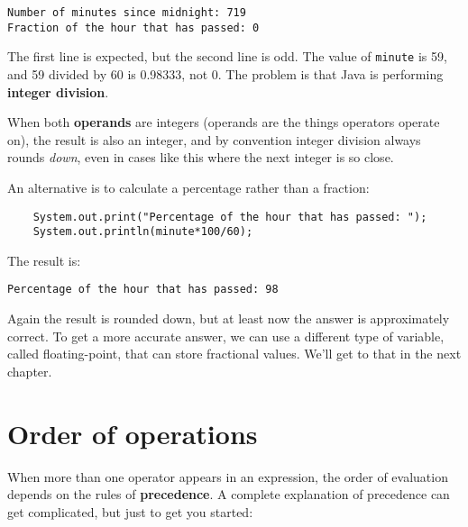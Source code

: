 \documentclass[12pt]{book}
\theoremstyle{definition}
\begin{document}
\begin{lstlisting}
Number of minutes since midnight: 719
Fraction of the hour that has passed: 0
\end{lstlisting}
%
The first line is expected, but the second line is
odd.  The value of {\tt minute} is 59, and
59 divided by 60 is 0.98333, not 0.  The problem is that
Java is performing {\bf integer division}.


When both {\bf operands} are integers (operands are the things
operators operate on), the result is also an integer,
and by convention integer division always rounds {\em down},
even in cases like this where the next integer is so close.

An alternative is to calculate a percentage
rather than a fraction:

\begin{lstlisting}
    System.out.print("Percentage of the hour that has passed: ");
    System.out.println(minute*100/60);
\end{lstlisting}
%
The result is:

\begin{lstlisting}
Percentage of the hour that has passed: 98
\end{lstlisting}
%
Again the result is rounded down, but at least now the answer
is approximately correct.  To get a more accurate
answer, we can use a different type of variable, called
floating-point, that can store fractional values.
We'll get to that in the next chapter.


\section{Order of operations}

When more than one operator appears in an expression, the order
of evaluation depends on the rules of {\bf precedence}.  A
complete explanation of precedence can get complicated, but
just to get you started:
\end{document}
